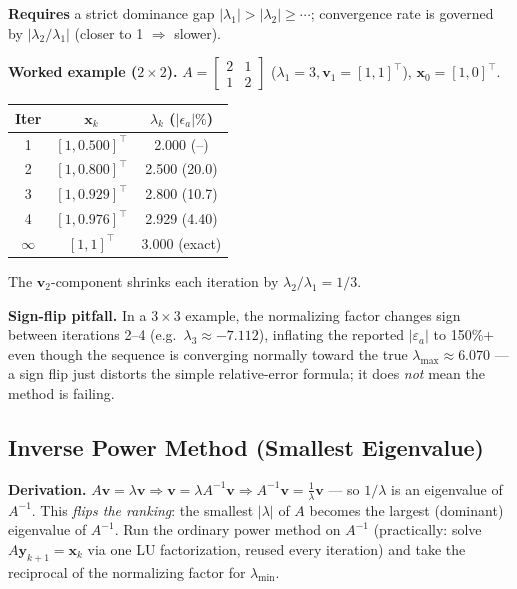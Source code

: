 \textbf{Requires} a strict dominance gap $|\lambda_1|>|\lambda_2|\ge\cdots$; convergence rate is governed by $|\lambda_2/\lambda_1|$ (closer to 1 $\Rightarrow$ slower).

\begin{examplebox}
\textbf{Worked example ($2\times2$).} $A=\begin{bmatrix}2&1\\1&2\end{bmatrix}$ ($\lambda_1=3,\mathbf v_1=[1,1]^\top$), $\mathbf x_0=[1,0]^\top$.
\begin{center}\small
\begin{tabular}{@{}ccc@{}}
\toprule
Iter & $\mathbf x_k$ & $\lambda_k$ ($|\epsilon_a|\%$)\\
\midrule
1 & $[1,0.500]^\top$ & 2.000 (--)\\
2 & $[1,0.800]^\top$ & 2.500 (20.0)\\
3 & $[1,0.929]^\top$ & 2.800 (10.7)\\
4 & $[1,0.976]^\top$ & 2.929 (4.40)\\
$\infty$ & $[1,1]^\top$ & 3.000 (exact)\\
\bottomrule
\end{tabular}
\end{center}
The $\mathbf v_2$-component shrinks each iteration by $\lambda_2/\lambda_1=1/3$.
\end{examplebox}

\begin{keypoint}
\textbf{Sign-flip pitfall.} In a $3\times3$ example, the normalizing factor changes sign between iterations 2--4 (e.g.\ $\lambda_3\approx-7.112$), inflating the reported $|\varepsilon_a|$ to 150\%+ even though the sequence is converging normally toward the true $\lambda_{\max}\approx6.070$ — a sign flip just distorts the simple relative-error formula; it does \emph{not} mean the method is failing.
\end{keypoint}

\subsection{Inverse Power Method (Smallest Eigenvalue)}

\begin{examplebox}
\textbf{Derivation.} $A\mathbf v=\lambda\mathbf v \Rightarrow \mathbf v = \lambda A^{-1}\mathbf v \Rightarrow A^{-1}\mathbf v = \tfrac1\lambda \mathbf v$ — so $1/\lambda$ is an eigenvalue of $A^{-1}$. This \emph{flips the ranking}: the smallest $|\lambda|$ of $A$ becomes the largest (dominant) eigenvalue of $A^{-1}$. Run the ordinary power method on $A^{-1}$ (practically: solve $A\mathbf y_{k+1}=\mathbf x_k$ via one LU factorization, reused every iteration) and take the reciprocal of the normalizing factor for $\lambda_{\min}$.
\end{examplebox}

